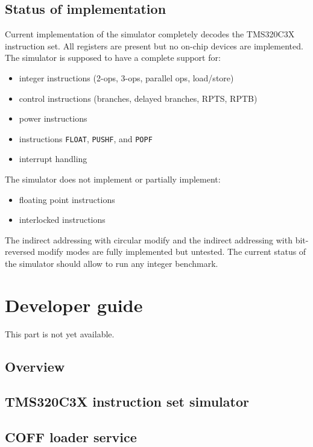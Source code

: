 \subsection{Status of implementation}

Current implementation of the simulator completely decodes the TMS320C3X instruction set.
All registers are present but no on-chip devices are implemented.
The simulator is supposed to have a complete support for:
\begin{itemize}
\item integer instructions (2-ops, 3-ops, parallel ops, load/store)
\item control instructions (branches, delayed branches, RPTS, RPTB)
\item power instructions
\item instructions \texttt{FLOAT}, \texttt{PUSHF}, and \texttt{POPF}
\item interrupt handling
\end{itemize}

The simulator does not implement or partially implement:
\begin{itemize}
\item floating point instructions
\item interlocked instructions
\end{itemize}

The indirect addressing with circular modify and the indirect addressing with bit-reversed modify modes are fully implemented but untested.
The current status of the simulator should allow to run any integer benchmark.

\section{Developer guide}

This part is not yet available.

\subsection{Overview}

\subsection{TMS320C3X instruction set simulator}

\subsection{COFF loader service}


